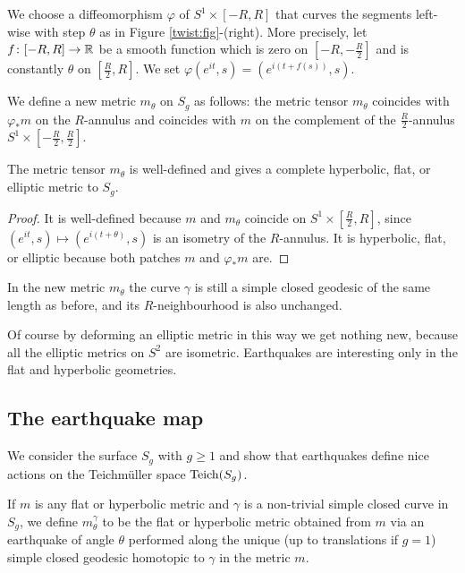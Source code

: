 We choose a diffeomorphism $\varphi$ of $S^1\times [-R, R]$ that curves the segments left-wise with step $\theta$ as in Figure \ref{twist:fig}-(right).  More precisely, let $f\colon[-R, R] \to \mathbb{R}$ be a smooth function which is zero on $\left[-R, -\frac R 2\right]$ and is constantly $\theta$ on $\left[\frac R 2,R\right]$. We set $\varphi(e^{it},s) = (e^{i(t+f(s))},s)$.

We define a new metric $m_\theta$ on $S_g$ as follows: the metric tensor $m_\theta$ coincides with $\varphi_* m$ on the $R$-annulus and coincides with $m$ on the complement of the $\frac{R}2$-annulus $S^1\times \left[-\frac R2, \frac R2\right]$.

\begin{prop} The metric tensor $m_\theta$ is well-defined and gives a complete hyperbolic, flat, or elliptic metric to $S_g$. 
\end{prop}
\begin{proof}
It is well-defined because $m$ and $m_\theta$ coincide on $S^1\times \left[\frac R 2, R\right]$, since $(e^{it},s)\mapsto (e^{i(t+\theta)},s)$ is an isometry of the $R$-annulus. It is hyperbolic, flat, or elliptic because both patches $m$ and $\varphi_*m$ are.
\end{proof}

\begin{oss} \label{R:oss}
In the new metric $m_\theta$ the curve $\gamma$ is still a simple closed geodesic of the same length as before, and its $R$-neighbourhood is also unchanged. 
\end{oss}

Of course by deforming an elliptic metric in this way we get nothing new, because all the elliptic metrics on $S^2$ are isometric. Earthquakes are interesting only in the flat and hyperbolic geometries.

\subsection{The earthquake map}
We consider the surface $S_g$ with $g\geqslant 1$ and show that earthquakes define nice actions on the Teichm\"uller space ${\rm Teich}(S_g)$. 

If $m$ is any flat or hyperbolic metric and $\gamma$ is a non-trivial simple closed curve in $S_g$, we define $m_\theta^\gamma$ to be the flat or hyperbolic metric obtained from $m$ via an earthquake of angle $\theta$ performed along the unique (up to translations if $g=1$) simple closed geodesic homotopic to $\gamma$ in the metric $m$.


